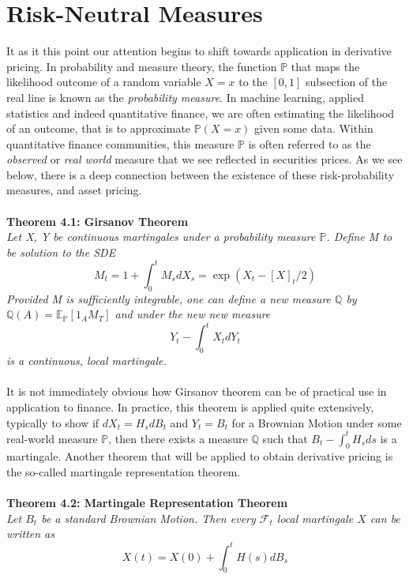 \documentclass{article}
\begin{document}
\newpage
\section{Risk-Neutral Measures}
It as it this point our attention begins to shift towards application in derivative pricing. In probability and measure theory, the function $\mathbb{P}$ that maps the likelihood outcome of a random variable $X=x$ to the $[0,1]$ subsection of the real line is known as the \textit{probability measure}. In machine learning, applied statistics and indeed quantitative finance, we are often estimating the likelihood of an outcome,  that is to approximate $\mathbb{P}(X=x)$ given some data. Within quantitative finance communities, this measure $\mathbb{P}$ is often
referred to as the \textit{observed} or \textit{real world} measure that we see reflected in securities prices. As we see below, there is a deep connection between the existence of these risk-probability measures, and asset pricing.\\
\\
\textbf{Theorem 4.1: Girsanov Theorem}\\
\textit{Let X, Y be continuous martingales under a probability measure $\mathbb{P}$. Define M to be solution to the SDE
$$M_{t}=1+\int_{0}^{t} M_{s} d X_{s}=\exp \left(X_{t}-[X]_{t} / 2\right)$$
Provided M is sufficiently integrable, one can define a new measure $\mathbb{Q}$ by $\mathbb{Q}(A) = \mathbb{E}_{\mathbb{P}}[1_{A}M_T]$ and under the new new measure $$Y_t - \int_{0}^{t}X_t dY_t$$ is a continuous, local martingale. } \\
\\
It is not immediately obvious how Girsanov theorem can be of practical use in application to finance. In practice, this theorem is applied quite extensively, typically to show if $dX_t = H_s dB_t$ and $Y_t = B_t$ for a Brownian Motion under some real-world measure $\mathbb{P}$, then there exists a measure $\mathbb{Q}$ such that $B_t - \int_{0}^{t}H_sds$ is a martingale. Another theorem that will be applied to obtain derivative pricing is the so-called martingale representation theorem. \\
\\
\textbf{Theorem 4.2: Martingale Representation Theorem}\\
\textit{Let $B_t$ be a standard Brownian Motion. Then every $\mathcal{F}_t$ local martingale $X$ can be written as 
$$X(t) = X(0) + \int_{0}^{t}H(s)dB_s$$}\\
\end{document}
